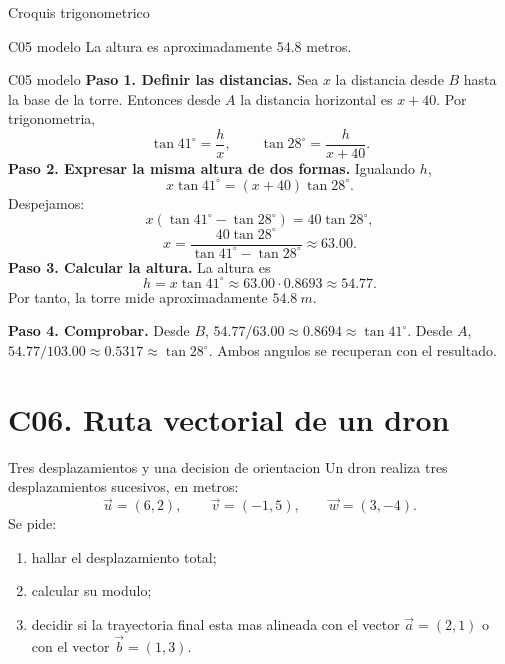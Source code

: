 \begin{databox}{Croquis trigonometrico}
\begin{center}
\end{center}
\end{databox}

\begin{shortanswer}{C05 modelo}
La altura es aproximadamente \(54.8\) metros.
\end{shortanswer}

\begin{fullsolution}{C05 modelo}
\textbf{Paso 1. Definir las distancias.}
Sea \(x\) la distancia desde \(B\) hasta la base de la torre. Entonces desde \(A\) la distancia
horizontal es \(x+40\). Por trigonometria,
\[
\tan 41^\circ=\frac{h}{x},
\qquad
\tan 28^\circ=\frac{h}{x+40}.
\]
\textbf{Paso 2. Expresar la misma altura de dos formas.}
Igualando \(h\),
\[
x\tan 41^\circ=(x+40)\tan 28^\circ.
\]
Despejamos:
\[
x(\tan 41^\circ-\tan 28^\circ)=40\tan 28^\circ,
\]
\[
x=\frac{40\tan 28^\circ}{\tan 41^\circ-\tan 28^\circ}\approx 63.00.
\]
\textbf{Paso 3. Calcular la altura.}
La altura es
\[
h=x\tan 41^\circ\approx 63.00\cdot 0.8693\approx 54.77.
\]
Por tanto, la torre mide aproximadamente \(\SI{54.8}{m}\).

\textbf{Paso 4. Comprobar.} Desde \(B\),
\(54.77/63.00\approx0.8694\approx\tan41^\circ\). Desde \(A\),
\(54.77/103.00\approx0.5317\approx\tan28^\circ\). Ambos angulos se recuperan con el resultado.
\end{fullsolution}

\section{C06. Ruta vectorial de un dron}

\begin{contextproblem}{Tres desplazamientos y una decision de orientacion}
Un dron realiza tres desplazamientos sucesivos, en metros:
\[
\vec u=(6,2),\qquad \vec v=(-1,5),\qquad \vec w=(3,-4).
\]
Se pide:
\begin{enumerate}
  \item hallar el desplazamiento total;
  \item calcular su modulo;
  \item decidir si la trayectoria final esta mas alineada con el vector
  \(\vec a=(2,1)\) o con el vector \(\vec b=(1,3)\).
\end{enumerate}
\end{contextproblem}

